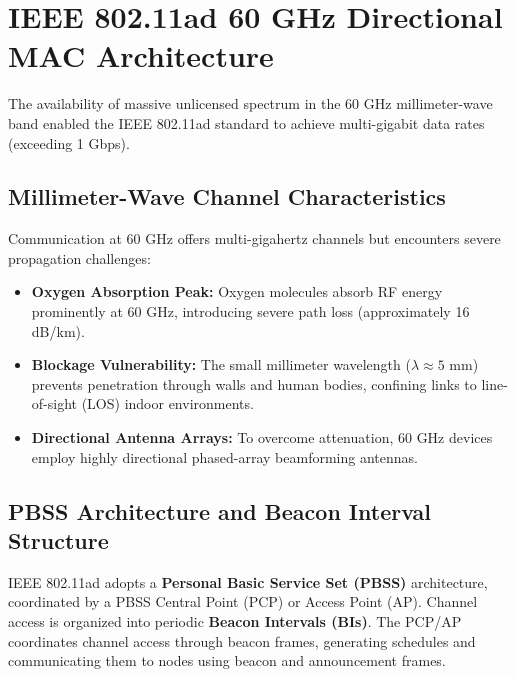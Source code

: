 \section{IEEE 802.11ad 60 GHz Directional MAC Architecture}
The availability of massive unlicensed spectrum in the 60 GHz millimeter-wave band enabled the IEEE 802.11ad standard to achieve multi-gigabit data rates (exceeding 1 Gbps).

\subsection{Millimeter-Wave Channel Characteristics}
Communication at 60 GHz offers multi-gigahertz channels but encounters severe propagation challenges:
\begin{itemize}
    \item \textbf{Oxygen Absorption Peak:} Oxygen molecules absorb RF energy prominently at 60 GHz, introducing severe path loss (approximately 16 dB/km).
    \item \textbf{Blockage Vulnerability:} The small millimeter wavelength ($\lambda \approx 5$ mm) prevents penetration through walls and human bodies, confining links to line-of-sight (LOS) indoor environments.
    \item \textbf{Directional Antenna Arrays:} To overcome attenuation, 60 GHz devices employ highly directional phased-array beamforming antennas.
\end{itemize}

\subsection{PBSS Architecture and Beacon Interval Structure}
IEEE 802.11ad adopts a \textbf{Personal Basic Service Set (PBSS)} architecture, coordinated by a PBSS Central Point (PCP) or Access Point (AP). Channel access is organized into periodic \textbf{Beacon Intervals (BIs)}. The PCP/AP coordinates channel access through beacon frames, generating schedules and communicating them to nodes using beacon and announcement frames.

